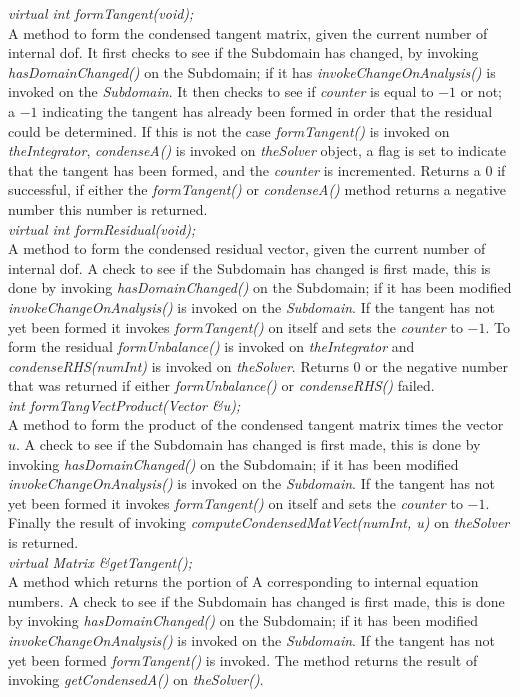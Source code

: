 {\em     virtual int  formTangent(void);}\\
A method to form the condensed tangent matrix, given the current
number of internal dof. It first checks to see if the Subdomain has
changed, by  invoking {\em hasDomainChanged()} on the Subdomain; if it
has {\em invokeChangeOnAnalysis()} is invoked on the {\em
Subdomain}. It then checks to see if {\em counter} is equal to $-1$ or
not; a $-1$ indicating the tangent has already been formed in order
that the residual could be determined. If this is not the case {\em
formTangent()} is invoked on {\em theIntegrator}, {\em condenseA()} is
invoked on {\em theSolver} object, a flag is set to indicate that the
tangent has been formed, and the {\em counter} is incremented. Returns
a $0$ if successful, if either the {\em formTangent()} or {\em
condenseA()} method returns a negative number this number is
returned. \\  

{\em     virtual int  formResidual(void);}\\
A method to form the condensed residual vector, given the current
number of internal dof. A check to see if the Subdomain has changed is first made, 
this is done by invoking {\em hasDomainChanged()} on the Subdomain; if it has 
been modified {\em invokeChangeOnAnalysis()} 
is invoked on the {\em Subdomain}. If the tangent has not yet been formed
it invokes {\em formTangent()} on itself and sets the {\em counter} to $-1$.
To form the residual {\em formUnbalance()} is invoked on {\em theIntegrator} and
{\em condenseRHS(numInt)} is invoked on {\em theSolver}. Returns $0$ or the negative
number that was returned if either {\em formUnbalance()} or {\em condenseRHS()} failed.\\

{\em int  formTangVectProduct(Vector \&u);}\\
A method to form the product of the condensed tangent matrix times the
vector $u$. A check to see if the Subdomain has changed is first made, 
this is done by invoking {\em hasDomainChanged()} on the Subdomain; if it has 
been modified {\em invokeChangeOnAnalysis()} 
is invoked on the {\em Subdomain}. If the tangent has not yet been formed
it invokes {\em formTangent()} on itself and sets the {\em counter} to $-1$.
Finally the result of invoking {\em computeCondensedMatVect(numInt, u)} on {\em
theSolver} is returned. \\


{\em virtual Matrix \&getTangent();}\\
A method which returns the portion of A corresponding to internal
equation numbers. A check to see if the Subdomain has changed is first made, 
this is done by invoking {\em hasDomainChanged()} on the Subdomain; if it has 
been modified {\em invokeChangeOnAnalysis()} is invoked on the {\em Subdomain}. 
If the tangent has not yet been formed {\em formTangent()} is invoked. 
The method returns the result of invoking {\em getCondensedA()} on {\em theSolver()}. \\


